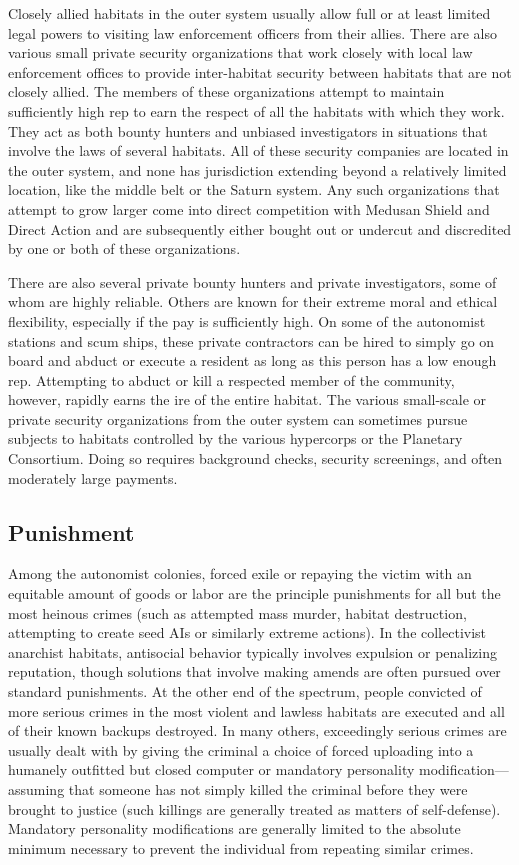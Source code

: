 Closely allied habitats in the outer system usually 
allow full or at least limited legal powers to visiting 
law enforcement officers from their allies. There are 
also various small private security organizations that 
work closely with local law enforcement offices  to 
provide inter-habitat security between habitats that 
are not closely allied. The members of these organizations attempt to maintain sufficiently high rep to 
earn the respect of all the habitats with which they 
work. They act as both bounty hunters and unbiased 
investigators in situations that involve the laws of 
several habitats. All of these security companies are 
located in the outer system, and none has jurisdiction 
extending beyond a relatively limited location, like 
the middle belt or the Saturn system. Any such organizations that attempt to grow larger come into direct 
competition with Medusan Shield and Direct Action 
and are subsequently either bought out or undercut 
and discredited by one or both of these organizations.

There are also several private bounty hunters and 
private investigators, some of whom are highly reliable. Others are known for their extreme moral and 
ethical flexibility, especially if the pay is sufficiently 
high. On some of the autonomist stations and scum 
ships, these private contractors can be hired to simply 
go on board and abduct or execute a resident as long 
as this person has a low enough rep. Attempting to 
abduct or kill a respected member of the community, 
however, rapidly earns the ire of the entire habitat. 
The various small-scale or private security organizations from the outer system can sometimes pursue 
subjects to habitats controlled by the various hypercorps or the Planetary Consortium. Doing so requires 
background checks, security screenings, and often 
moderately large payments.

\subsection{Punishment}

Among the autonomist colonies, forced exile or repaying the victim with an equitable amount of goods or 
labor are the principle punishments for all but the most 
heinous crimes (such as attempted mass murder, habitat 
destruction, attempting to create seed AIs or similarly 
extreme actions). In the collectivist anarchist habitats, 
antisocial behavior typically involves expulsion or 
penalizing reputation, though solutions that involve 
making amends are often pursued over standard punishments. At the other end of the spectrum, people convicted of more serious crimes in the most violent and 
lawless habitats are executed and all of their known 
backups destroyed. In many others, exceedingly serious 
crimes are usually dealt with by giving the criminal a 
choice of forced uploading into a humanely outfitted 
but closed computer or mandatory personality modification—assuming that someone has not simply killed 
the criminal before they were brought to justice (such 
killings are generally treated as matters of self-defense). 
Mandatory personality modifications are generally 
limited to the absolute minimum necessary to prevent 
the individual from repeating similar crimes.

